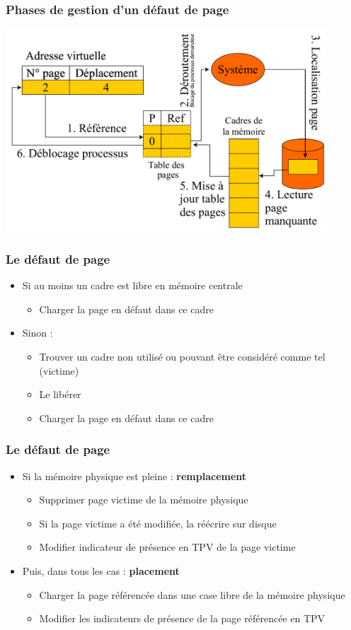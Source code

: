 \begin{frame}
\frametitle{Phases de gestion d'un défaut de page}
\includegraphics[width=0.9\textwidth]{../illustration/traitement_defaut_page.pdf}
\end{frame}


\begin{frame}
\frametitle{Le défaut de page}
\begin{itemize}
\item Si au moins un cadre est libre en mémoire centrale
\begin{itemize}
\item Charger la page en défaut dans ce cadre
\end{itemize}
\item Sinon :
\begin{itemize}
\item Trouver un cadre non utilisé ou pouvant être considéré comme tel (victime)
\item Le libérer
\item Charger la page en défaut dans ce cadre
\end{itemize}
\end{itemize}

\end{frame}


\begin{frame}
\frametitle{Le défaut de page}
\begin{itemize}
\item Si la mémoire physique est pleine : \textbf{remplacement}
\begin{itemize}
\item Supprimer page victime de la mémoire physique
\item Si la page victime a été modifiée, la réécrire sur disque
\item Modifier indicateur de présence en TPV de la page victime
\end{itemize}
\item Puis, dans tous les cas : \textbf{placement}
\begin{itemize}
\item Charger la page référencée dans une case libre de la mémoire physique
\item Modifier les indicateurs de présence de la page référencée en TPV
\end{itemize}
\end{itemize}
\end{frame}


